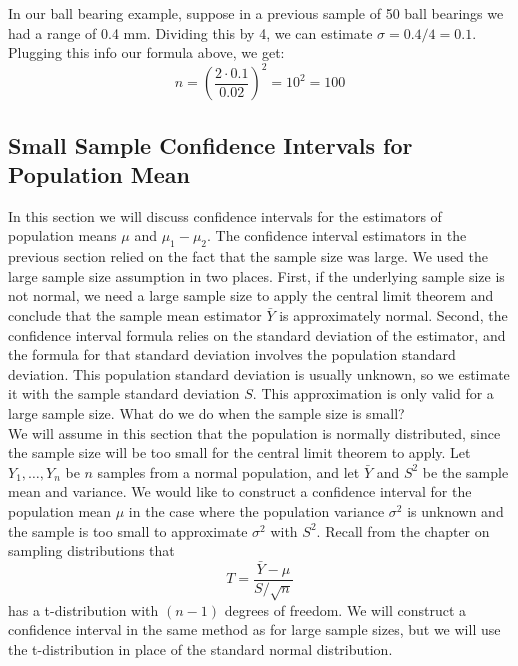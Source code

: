\documentclass[12pt]{article}
\theoremstyle{definition}
\theoremstyle{remark}
\begin{document}
In our ball bearing example, suppose in a previous sample of 50 ball bearings we had a range of 0.4 mm. Dividing this by 4, we can estimate $\sigma = 0.4/4 = 0.1$. Plugging this info our formula above, we get:
\[
n = \left( \frac{2 \cdot 0.1}{0.02}\right)^2 = 10^2 = 100
\]

\subsection{Small Sample Confidence Intervals for Population Mean}
In this section we will discuss confidence intervals for the estimators of population means $\mu$ and $\mu_1 - \mu_2$. The confidence interval estimators in the previous section relied on the fact that the sample size was large. We used the large sample size assumption in two places. First, if the underlying sample size is not normal, we need a large sample size to apply the central limit theorem and conclude that the sample mean estimator $\bar{Y}$ is approximately normal. Second, the confidence interval formula relies on the standard deviation of the estimator, and the formula for that standard deviation involves the population standard deviation. This population standard deviation is usually unknown, so we estimate it with the sample standard deviation $S$. This approximation is only valid for a large sample size. What do we do when the sample size is small?\\

We will assume in this section that the population is normally distributed, since the sample size will be too small for the central limit theorem to apply. Let $Y_1, \dots, Y_n$ be $n$ samples from a normal population, and let $\bar{Y}$ and $S^2$ be the sample mean and variance. We would like to construct a confidence interval for the population mean $\mu$ in the case where the population variance $\sigma^2$ is unknown and the sample is too small to approximate $\sigma^2$ with $S^2$. Recall from the chapter on sampling distributions that 
\[
T = \frac{\bar{Y} - \mu}{S/\sqrt{n}}
\]
has a t-distribution with $(n-1)$ degrees of freedom. We will construct a confidence interval in the same method as for large sample sizes, but we will use the t-distribution in place of the standard normal distribution. 
\end{document}
